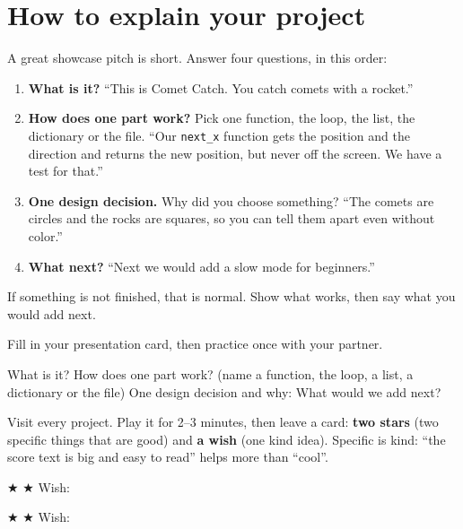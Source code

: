 \section{How to explain your project}
A great showcase pitch is short. Answer four questions, in this order:
\begin{enumerate}
  \item \textbf{What is it?} \enquote{This is Comet Catch. You catch comets with a rocket.}
  \item \textbf{How does one part work?} Pick one function, the loop, the list, the dictionary or the file. \enquote{Our \texttt{next\_x} function gets the position and the direction and returns the new position, but never off the screen. We have a test for that.}
  \item \textbf{One design decision.} Why did you choose something? \enquote{The comets are circles and the rocks are squares, so you can tell them apart even without color.}
  \item \textbf{What next?} \enquote{Next we would add a slow mode for beginners.}
\end{enumerate}
If something is not finished, that is normal. Show what works, then say what you would add next.

\begin{exercise}
Fill in your presentation card, then practice once with your partner.

What is it? 
How does one part work? (name a function, the loop, a list, a dictionary or the file) 
One design decision and why: 
What would we add next? 
\end{exercise}

\begin{exercise}
Visit every project. Play it for 2--3 minutes, then leave a card: \textbf{two stars} (two specific
things that are good) and \textbf{a wish} (one kind idea). Specific is kind: \enquote{the score
text is big and easy to read} helps more than \enquote{cool}.

\begin{tcolorbox}[colback=white,colframe=kcpurple!80!black,boxrule=0.8pt,arc=2pt,title={\small\bfseries Feedback card for: \rule{4cm}{0.4pt}},coltitle=black,colbacktitle=kcpurple!25]
★ 
★ 
Wish: 
\end{tcolorbox}
\begin{tcolorbox}[colback=white,colframe=kcpurple!80!black,boxrule=0.8pt,arc=2pt,title={\small\bfseries Feedback card for: \rule{4cm}{0.4pt}},coltitle=black,colbacktitle=kcpurple!25]
★ 
★ 
Wish: 
\end{tcolorbox}
\end{exercise}

